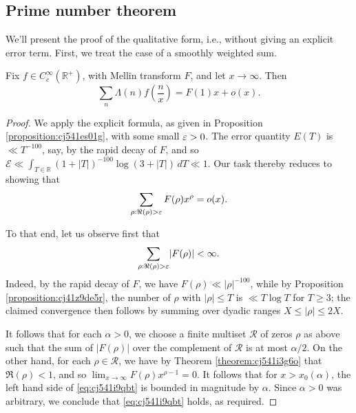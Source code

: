 \documentclass[reqno]{amsart}  \numberwithin{theorem}{section} \numberwithin{equation}{section}
\begin{document}
\subsection{Prime number theorem}\label{sec:cj56fbu411}

We'll present the proof of the qualitative form, i.e., without giving an explicit error term.  First, we treat the case of a smoothly weighted sum.
\begin{theorem}\label{theorem:cj56e013t4}
  Fix $f \in C_c^\infty (\mathbb{R}^+ )$, with Mellin transform $F$, and let $x \rightarrow \infty$.  Then
  \begin{equation*}
    \sum_{n} \Lambda (n) f \left( \frac{n}{x} \right) = F(1) x + o(x).
  \end{equation*}
\end{theorem}
\begin{proof}
  We apply the explicit formula, as given in Proposition \ref{proposition:cj541es01g}, with some small $\varepsilon > 0$.  The error quantity $E(T)$ is $\ll T^{-100}$, say, by the rapid decay of $F$, and so $\mathcal{E} \ll \int_{T \in \mathbb{R} } (1 + \lvert T \rvert)^{-100} \log(3 + |T|) \, d T \ll 1$.  Our task thereby reduces to showing that
  \begin{equation}\label{eq:cj541i9qbt}
    \sum_{\rho : \Re(\rho) > \varepsilon } F(\rho) x^\rho = o(x).
  \end{equation}
  
  To that end, let us observe first that
  \begin{equation*}
    \sum_{\rho : \Re(\rho) > \varepsilon } \lvert F(\rho) \rvert < \infty.
  \end{equation*}
  Indeed, by the rapid decay of $F$, we have $F(\rho) \ll \lvert \rho \rvert^{-100}$, while by Proposition \ref{proposition:cj41z9de5r}, the number of $\rho$ with $\lvert \rho \rvert \leq T$ is $\ll T \log T$ for $T \geq 3$; the claimed convergence then follows by summing over dyadic ranges $X \leq \lvert \rho \rvert \leq 2X$.

  It follows that for each $\alpha > 0$, we choose a finite multiset $\mathcal{R}$ of zeros $\rho$ as above such that the sum of $\lvert F(\rho) \rvert$ over the complement of $\mathcal{R}$ is at most $\alpha/2$.  On the other hand, for each $\rho \in \mathcal{R}$, we have by Theorem \ref{theorem:cj541i3g6o} that $\Re(\rho) < 1$, and so $\lim_{x \rightarrow \infty } F(\rho) x^{\rho-1} = 0$.  It follows that for $x > x_0(\alpha)$, the left hand side of \eqref{eq:cj541i9qbt} is bounded in magnitude by $\alpha$.  Since $\alpha > 0$ was arbitrary, we conclude that \eqref{eq:cj541i9qbt} holds, as required.
\end{proof}
\end{document}
